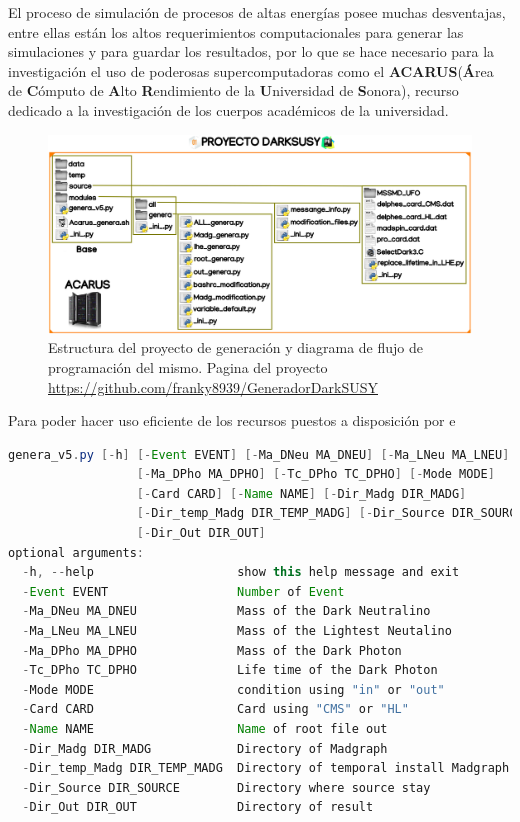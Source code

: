 El proceso de simulación de procesos de altas energías posee muchas desventajas, entre ellas están los altos requerimientos computacionales para generar las simulaciones y para guardar los resultados, por lo que se hace necesario para la investigación el uso de poderosas supercomputadoras como el \textbf{ACARUS}(\textbf{Á}rea de \textbf{C}ómputo de \textbf{A}lto \textbf{R}endimiento de la \textbf{U}niversidad de \textbf{S}onora), recurso dedicado a la investigación de los cuerpos académicos de la universidad.
\begin{figure}[ht]
\centering
\includegraphics[width=.8\textwidth]{Simulacion/imagenes/proyecto_darksusy.png}
\caption{Estructura del proyecto de generación y diagrama de flujo de programación del mismo. Pagina del proyecto \url{https://github.com/franky8939/GeneradorDarkSUSY}}
\label{genera_darksusy}
\end{figure}

Para poder hacer uso eficiente de los recursos puestos a disposición por e


\begin{lstlisting}[language=java]
genera_v5.py [-h] [-Event EVENT] [-Ma_DNeu MA_DNEU] [-Ma_LNeu MA_LNEU]
                  [-Ma_DPho MA_DPHO] [-Tc_DPho TC_DPHO] [-Mode MODE]
                  [-Card CARD] [-Name NAME] [-Dir_Madg DIR_MADG]
                  [-Dir_temp_Madg DIR_TEMP_MADG] [-Dir_Source DIR_SOURCE]
                  [-Dir_Out DIR_OUT]
optional arguments:
  -h, --help                    show this help message and exit
  -Event EVENT                  Number of Event
  -Ma_DNeu MA_DNEU              Mass of the Dark Neutralino
  -Ma_LNeu MA_LNEU              Mass of the Lightest Neutalino
  -Ma_DPho MA_DPHO              Mass of the Dark Photon
  -Tc_DPho TC_DPHO              Life time of the Dark Photon
  -Mode MODE                    condition using "in" or "out"
  -Card CARD                    Card using "CMS" or "HL"
  -Name NAME                    Name of root file out
  -Dir_Madg DIR_MADG            Directory of Madgraph
  -Dir_temp_Madg DIR_TEMP_MADG  Directory of temporal install Madgraph
  -Dir_Source DIR_SOURCE        Directory where source stay
  -Dir_Out DIR_OUT              Directory of result
\end{lstlisting}








